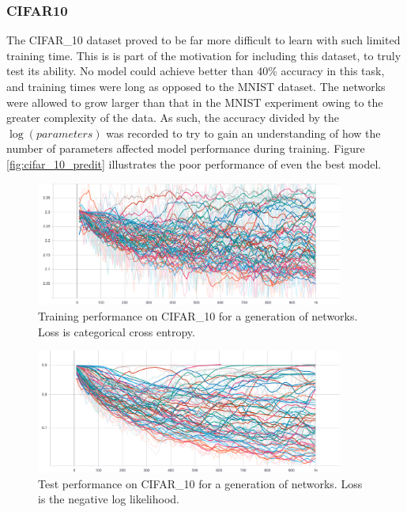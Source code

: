         \subsubsection{CIFAR10}
        The CIFAR\_10 dataset proved to be far more difficult to learn with such limited training time.
        This is is part of the motivation for including this dataset, to truly test its ability. No model could achieve better than 40\% accuracy in this task, and training times were long as opposed to the MNIST dataset. The networks were allowed to grow larger than that in the MNIST experiment owing to the greater complexity of the data. As such, the accuracy divided by the $\log(parameters)$ was recorded to try to gain an understanding of how the number of parameters affected model performance during training. Figure \ref{fig:cifar_10_predit} illustrates the poor performance of even the best model.
                \begin{figure}[h]
                        \centering
                        \label{fig:cifar_10_train}
                        \includegraphics[width=0.9\textwidth]{4_results/imgs/cifar_10/Training_loss}
                    \caption{Training performance on CIFAR\_10 for a generation of networks. Loss is categorical cross entropy.}
                \end{figure}


                \begin{figure}[h]
                        \centering
                        \label{fig:cifar_10_test}
                        \includegraphics[width=0.9\textwidth]{4_results/imgs/cifar_10/Test_loss}
                    \caption{Test performance on CIFAR\_10 for a generation of networks. Loss is the negative log likelihood.}
                \end{figure}

